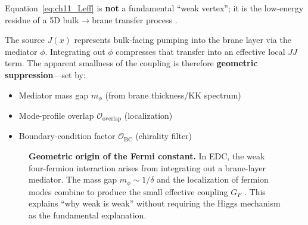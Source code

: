 \begin{tcolorbox}[edcCornerstone, title=\textbf{Physical Interpretation (Canonical)}]
Equation~\eqref{eq:ch11_Leff} is \textbf{not} a fundamental ``weak vertex'';
it is the low-energy residue of a 5D bulk$\to$brane transfer process \tagDc{}.

The source $J(x)$ represents bulk-facing pumping into the brane layer via the
mediator $\phi$. Integrating out $\phi$ compresses that transfer into an
effective local $JJ$ term. The apparent smallness of the coupling is therefore
\textbf{geometric suppression}---set by:
\begin{itemize}[nosep]
    \item Mediator mass gap $m_\phi$ (from brane thickness/KK spectrum)
    \item Mode-profile overlap $\mathcal{O}_{\text{overlap}}$ (localization)
    \item Boundary-condition factor $\mathcal{O}_{\text{BC}}$ (chirality filter)
\end{itemize}
\end{tcolorbox}

\begin{figure}[htbp]
\centering
{}
\caption{\textbf{Geometric origin of the Fermi constant.}
In EDC, the weak four-fermion interaction arises from integrating out a
brane-layer mediator. The mass gap $m_\phi \sim 1/\delta$ and the localization
of fermion modes combine to produce the small effective coupling $G_F$ \tagDc{}.
This explains ``why weak is weak'' without requiring the Higgs mechanism as
the fundamental explanation.}
\label{fig:ch11_mediator_integration}
\end{figure}

